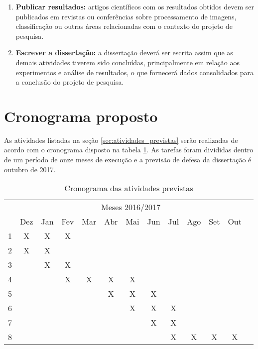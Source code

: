 \begin{enumerate}
    \item \textbf{Publicar resultados:} artigos científicos com os resultados obtidos devem ser publicados em revistas ou conferências sobre processamento de imagens, classificação ou outras áreas relacionadas com o contexto do projeto de pesquisa.

    \item \textbf{Escrever a dissertação:} a dissertação deverá ser escrita assim que as demais atividades tiverem sido concluídas, principalmente em relação aos experimentos e análise de resultados, o que fornecerá dados consolidados para a conclusão do projeto de pesquisa.
\end{enumerate}

\section{Cronograma proposto}
\label{sec:cronograma}
As atividades listadas na seção \ref{sec:atividades_previstas} serão realizadas de acordo com o cronograma disposto na tabela \ref{tab:cronograma_proposto}. As tarefas foram divididas dentro de um período de onze meses de execução e a previsão de defesa da dissertação é outubro de 2017.

\begin{table}[!htpb]
\centering
\begin{small} 
  
\setlength{\tabcolsep}{6pt} 

\begin{tabular}{|c|c|c|c|c|c|c|c|c|c|c|c|c|}\hline
 & \multicolumn{11}{c|}{Meses 2016/2017}\\ \cline{2-12}
\raisebox{1.5ex}{Atividade} & Dez & Jan & Fev & Mar & Abr & Mai & Jun & Jul & Ago & Set & Out \\ \hline

1 & X & X & X &   &   &   &   &   &   &   & \\ \hline
2 & X & X &   &   &   &   &   &   &   &   & \\ \hline
3 &   & X & X &   &   &   &   &   &   &   & \\ \hline
4 &   &   & X & X & X & X &   &   &   &   & \\ \hline
5 &   &   &   &   & X & X & X &   &   &   & \\ \hline
6 &   &   &   &   &   & X & X & X &   &   & \\ \hline
7 &   &   &   &   &   &   & X & X &   &   & \\ \hline
8 &   &   &   &   &   &   &   & X & X & X & X \\ \hline

\end{tabular} 
\end{small}
\caption{Cronograma das atividades previstas}
\label{tab:cronograma_proposto}
\end{table}
